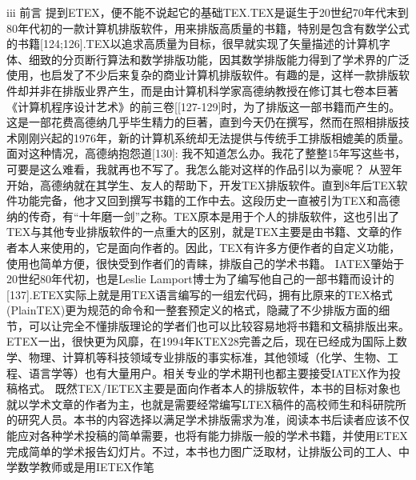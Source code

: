 \documentclass[UTF8]{ctexart}
\begin{document}
iii
前言
提到ETEX，便不能不说起它的基础TEX.TEX是诞生于20世纪70年代末到80年代初的一款计算机排版软件，用来排版高质量的书籍，特别是包含有数学公式的书籍[124;126].TEX以追求高质量为目标，很早就实现了矢量描述的计算机字体、细致的分页断行算法和数学排版功能，因其数学排版能力得到了学术界的广泛使用，也启发了不少后来复杂的商业计算机排版软件。有趣的是，这样一款排版软件却并非在排版业界产生，而是由计算机科学家高德纳教授在修订其七卷本巨著《计算机程序设计艺术》的前三卷[[127-129]时，为了排版这一部书籍而产生的。这是一部花费高德纳几乎毕生精力的巨著，直到今天仍在撰写，然而在照相排版技术刚刚兴起的1976年，新的计算机系统却无法提供与传统手工排版相媲美的质量。面对这种情况，高德纳抱怨道[130]:
我不知道怎么办。我花了整整15年写这些书，可要是这么难看，我就再也不写了。我怎么能对这样的作品引以为豪呢？
从翌年开始，高德纳就在其学生、友人的帮助下，开发TEX排版软件。直到8年后TEX软件功能完备，他才又回到撰写书籍的工作中去。这段历史一直被引为TEX和高德纳的传奇，有“十年磨一剑”之称。TEX原本是用于个人的排版软件，这也引出了TEX与其他专业排版软件的一点重大的区别，就是TEX主要是由书籍、文章的作者本人来使用的，它是面向作者的。因此，TEX有许多方便作者的自定义功能，使用也简单方便，很快受到作者们的青睐，排版自己的学术书籍。
IATEX肇始于20世纪80年代初，也是Leslie Lamport博士为了编写他自己的一部书籍而设计的[137].ETEX实际上就是用TEX语言编写的一组宏代码，拥有比原来的TEX格式(PlainTEX)更为规范的命令和一整套预定义的格式，隐藏了不少排版方面的细节，可以让完全不懂排版理论的学者们也可以比较容易地将书籍和文稿排版出来。ETEX一出，很快更为风靡，在1994年KTEX28完善之后，现在已经成为国际上数学、物理、计算机等科技领域专业排版的事实标准，其他领域（化学、生物、工程、语言学等）也有大量用户。相关专业的学术期刊也都主要接受IATEX作为投稿格式。
既然TEX/IETEX主要是面向作者本人的排版软件，本书的目标对象也就以学术文章的作者为主，也就是需要经常编写LTEX稿件的高校师生和科研院所的研究人员。本书的内容选择以满足学术排版需求为准，阅读本书后读者应该不仅能应对各种学术投稿的简单需要，也将有能力排版一般的学术书籍，并使用ETEX完成简单的学术报告幻灯片。不过，本书也力图广泛取材，让排版公司的工人、中学数学教师或是用IETEX作笔
\end{document}
